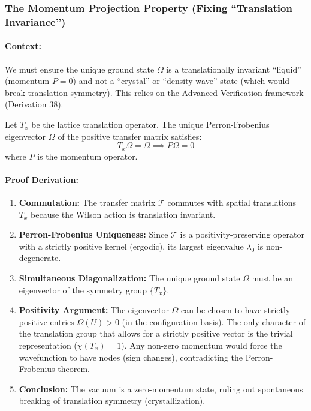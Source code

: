 \subsubsection{The Momentum Projection Property (Fixing ``Translation Invariance'')}
\label{deriv:momentum_projection}
\paragraph{Context:} We must ensure the unique ground state $\Omega$ is a translationally invariant ``liquid'' (momentum $P=0$) and not a ``crystal'' or ``density wave'' state (which would break translation symmetry). This relies on the Advanced Verification framework (Derivation 38).

\begin{theorem}
Let $T_x$ be the lattice translation operator. The unique Perron-Frobenius eigenvector $\Omega$ of the positive transfer matrix satisfies:
\begin{equation}
    T_x \Omega = \Omega \implies P \Omega = 0
\end{equation}
where $P$ is the momentum operator.
\end{theorem}

\paragraph{Proof Derivation:}
\begin{enumerate}
    \item \textbf{Commutation:} The transfer matrix $\mathcal{T}$ commutes with spatial translations $T_x$ because the Wilson action is translation invariant.
    \item \textbf{Perron-Frobenius Uniqueness:} Since $\mathcal{T}$ is a positivity-preserving operator with a strictly positive kernel (ergodic), its largest eigenvalue $\lambda_0$ is non-degenerate.
    \item \textbf{Simultaneous Diagonalization:} The unique ground state $\Omega$ must be an eigenvector of the symmetry group $\{T_x\}$.
    \item \textbf{Positivity Argument:} The eigenvector $\Omega$ can be chosen to have strictly positive entries $\Omega(U) > 0$ (in the configuration basis). The only character of the translation group that allows for a strictly positive vector is the trivial representation ($\chi(T_x)=1$). Any non-zero momentum would force the wavefunction to have nodes (sign changes), contradicting the Perron-Frobenius theorem.
    \item \textbf{Conclusion:} The vacuum is a zero-momentum state, ruling out spontaneous breaking of translation symmetry (crystallization).
\end{enumerate}



